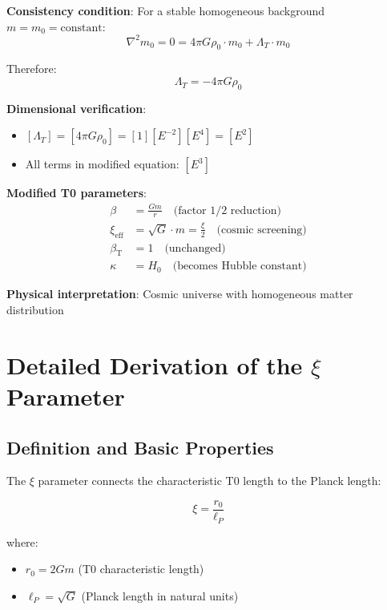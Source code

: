 \documentclass[12pt,a4paper]{article}
\newcommand{\betaT}{\beta_{\text{T}}}
\begin{document}
	\textbf{Consistency condition}: For a stable homogeneous background $m = m_0 = \text{constant}$:
	\begin{equation}
		\nabla^2 m_0 = 0 = 4\pi G \rho_0 \cdot m_0 + \Lambda_T \cdot m_0
	\end{equation}
	
	Therefore:
	\begin{equation}
		\boxed{\Lambda_T = -4\pi G \rho_0}
	\end{equation}
	
	\textbf{Dimensional verification}:
	\begin{itemize}
		\item $[\Lambda_T] = [4\pi G \rho_0] = [1][E^{-2}][E^4] = [E^2]$ \checkmark
		\item All terms in modified equation: $[E^3]$ \checkmark
	\end{itemize}
	
	\textbf{Modified T0 parameters}:
	\begin{align}
		\beta &= \frac{Gm}{r} \quad \text{(factor 1/2 reduction)} \\
		\xi_{\text{eff}} &= \sqrt{G} \cdot m = \frac{\xi}{2} \quad \text{(cosmic screening)} \\
		\betaT &= 1 \quad \text{(unchanged)} \\
		\kappa &= H_0 \quad \text{(becomes Hubble constant)}
	\end{align}
	
	\textbf{Physical interpretation}: Cosmic universe with homogeneous matter distribution
	
	\section{Detailed Derivation of the $\xi$ Parameter}
	\label{sec:xi_derivation}
	
	\subsection{Definition and Basic Properties}
	\label{subsec:xi_definition}
	
	The $\xi$ parameter connects the characteristic T0 length to the Planck length:
	
	\begin{equation}
		\xi = \frac{r_0}{\ell_P}
	\end{equation}
	
	where:
	\begin{itemize}
		\item $r_0 = 2Gm$ (T0 characteristic length)
		\item $\ell_P = \sqrt{G}$ (Planck length in natural units)
	\end{itemize}
	
\end{document}
